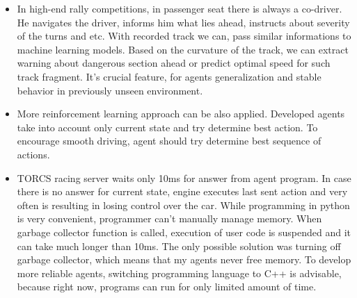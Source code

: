 \documentclass[declaration,shortabstract,english,inz]{iithesis}
\begin{document}
\begin{itemize}
    \item In high-end rally competitions, in passenger seat there is always a co-driver.
    He navigates the driver, informs him what lies ahead, instructs about severity of the turns and etc.
    With recorded track we can, pass similar informations to machine learning models. Based on the curvature of the track, we can extract warning about dangerous section ahead or predict optimal speed for such track fragment.
    It's crucial feature, for agents generalization and stable behavior in previously unseen environment.

    \item More reinforcement learning approach can be also applied.
    Developed agents take into account only current state and try determine best action.
    To encourage smooth driving, agent should try determine best sequence of actions.

    \item TORCS racing server waits only 10ms for answer from agent program.
In case there is no answer for current state, engine executes last sent action and very often is resulting in losing control over the car.
While programming in python is very convenient, programmer can't manually manage memory.
When garbage collector function is called, execution of user code is suspended and it can take much longer than 10ms.
The only possible solution was turning off garbage collector, which means that my agents never free memory.
To develop more reliable agents, switching programming language to C++ is advisable, because right now, programs can run for only limited amount of time.
\end{itemize}


\end{document}
